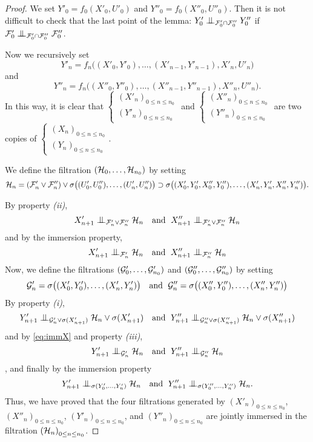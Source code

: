 \documentclass[12pt,a4paper]{article}
\begin{document}
\begin{proof}
We set $Y'_0 = f_0(X'_0, U'_0)$ and $Y''_0 = f_0(X''_0, U''_0)$. 
Then it is not difficult to check that 
the last point of the lemma:
 $Y'_0 \indep_{\FF'_0\cap\FF''_0} Y''_0$ if $\FF'_0 \indep_{\FF'_0\cap\FF''_0} \FF''_0$.

Now we recursively set 
$$
Y'_n = f_n\bigl((X'_0,Y'_0), \ldots, (X'_{n-1}, Y'_{n-1}), X'_n, U'_n\bigr)
$$
and 
$$
Y''_n = f_n\bigl((X''_0,Y''_0), \ldots, (X''_{n-1}, Y''_{n-1}), X''_n, U''_n\bigr).
$$
In this way, it is clear that $\left\{\begin{smallmatrix} {(X'_n)}_{0 \leq n \leq n_0} \\ 
{(Y'_n)}_{0 \leq n \leq n_0}
\end{smallmatrix}\right.$ and 
$\left\{\begin{smallmatrix} {(X''_n)}_{0 \leq n \leq n_0} \\ 
{(Y''_n)}_{0 \leq n \leq n_0}
\end{smallmatrix}\right.$
are two copies of 
$\left\{\begin{smallmatrix} {(X_n)}_{0 \leq n \leq n_0} \\ 
{(Y_n)}_{0 \leq n \leq n_0}
\end{smallmatrix}\right.$.

We define the filtration $(\mathcal{H}_0, \ldots, \mathcal{H}_{n_0})$ by setting 
$$
\mathcal{H}_n = (\mathcal{F}'_n \vee \mathcal{F}''_n) \vee \sigma\bigl((U'_0,U''_0), \ldots, (U'_n, U''_n) \bigr) 
\supset  \sigma\bigl((X'_0,Y'_0,X''_0, Y''_0), \ldots, (X'_n,Y'_n,X''_n, Y''_n) \bigr).
$$

By property {\it(ii)}, 
$$
X'_{n+1} \indep_{\FF'_n\vee\FF''_n} \HH_n 
\quad \text{and }\;
X''_{n+1} \indep_{\FF'_n\vee\FF''_n} \HH_n 
$$
and by the immersion property, 
\begin{equation}\label{eq:immX}
X'_{n+1} \indep_{\FF'_n} \HH_n 
\quad \text{and }\;
X''_{n+1} \indep_{\FF''_n} \HH_n 
\end{equation}
Now, we define the filtrations  $(\mathcal{G}'_0, \ldots, \mathcal{G}'_{n_0})$ 
and  $(\mathcal{G}''_0, \ldots, \mathcal{G}''_{n_0})$ by setting 
$$
\mathcal{G}'_n = \sigma\bigl((X'_0,Y'_0), \ldots, (X'_n, Y'_n)\bigr) 
\quad \text{and }\;
\mathcal{G}''_n = \sigma\bigl((X''_0,Y''_0), \ldots, (X''_n, Y''_n)\bigr) 
$$
By property {\it(i)}, 
$$
Y'_{n+1} \indep_{\GG'_n \vee \sigma(X'_{n+1})} \HH_n \vee \sigma(X'_{n+1})
\quad \text{and }\;
Y''_{n+1} \indep_{\GG''_n \vee \sigma(X''_{n+1})} \HH_n \vee \sigma(X''_{n+1})
$$
and by \eqref{eq:immX} and property {\it(iii)},
$$
Y'_{n+1} \indep_{\GG'_n} \HH_n 
\quad \text{and }\;
Y''_{n+1} \indep_{\GG''_n} \HH_n
$$, 
and finally by the immersion property 
$$
Y'_{n+1} \indep_{\sigma(Y'_0, \ldots, Y'_n)} \HH_n 
\quad \text{and }\;
Y''_{n+1} \indep_{\sigma(Y''_0, \ldots, Y''_n)} \HH_n.
$$
Thus, we have proved that the four filtrations generated by 
${(X'_n)}_{0 \leq n \leq n_0}$, ${(X''_n)}_{0 \leq n \leq n_0}$, 
${(Y'_n)}_{0 \leq n \leq n_0}$, and ${(Y''_n)}_{0 \leq n \leq n_0}$ 
are jointly immersed in the filtration ${(\mathcal{H}_n)}_{0 \leq n \leq n_0}$.
\end{proof}
\end{document}
